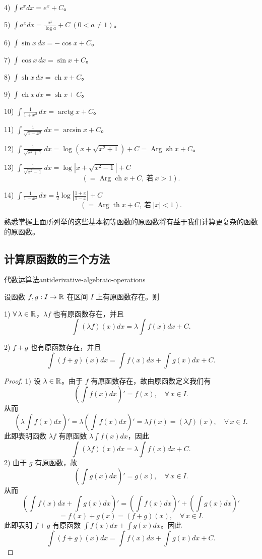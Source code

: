 4) \(\displaystyle\int e^x dx=e^x+C\)。

5) \(\displaystyle\int a^x dx=\frac{a^x}{\log a}+C\ (0<a\neq1)\)。

6) \(\displaystyle\int\sin x\,dx=-\cos x+C\)。

7) \(\displaystyle\int\cos x\,dx=\sin x+C\)。

8) \(\displaystyle\int\operatorname{sh}x\,dx=\operatorname{ch}x+C\)。

9) \(\displaystyle\int\operatorname{ch}x\,dx=\operatorname{sh}x+C\)。

10) \(\displaystyle\int\frac1{1+x^2}\,dx=\operatorname{arctg}x+C\)。

11) \(\displaystyle\int\frac1{\sqrt{1-x^2}}\,dx=\arcsin x+C\)。

12) \(\displaystyle\int\frac1{\sqrt{x^2+1}}\,dx=\log\left(x+\sqrt{x^2+1}\right)+C=\operatorname{Arg}\operatorname{sh}x+C\)。

13) \(\displaystyle\int\frac1{\sqrt{x^2-1}}\,dx=\log\left|x+\sqrt{x^2-1}\right|+C\)
\[
\left(=\operatorname{Arg}\operatorname{ch}x+C,\ \text{若}\ x>1\right).
\]

14) \(\displaystyle\int\frac1{1-x^2}\,dx=\frac12\log\left|\frac{1+x}{1-x}\right|+C\)
\[
\left(=\operatorname{Arg}\operatorname{th}x+C,\ \text{若}\ |x|<1\right).
\]

熟悉掌握上面所列举的这些基本初等函数的原函数将有益于我们计算更复杂的函数的原函数。

\subsection{计算原函数的三个方法}
	\label{sec:7-2-2}

\begin{mythm}{代数运算法}{antiderivative-algebraic-operations}

	设函数 \(f,g:I\to\mathbb{R}\) 在区间 \(I\) 上有原函数存在。则

	1) \(\forall\,\lambda\in\mathbb{R}\)，\(\lambda f\) 也有原函数存在，并且
	\[
	\int(\lambda f)(x)dx=\lambda\int f(x)dx+C.
	\]

	2) \(f+g\) 也有原函数存在，并且
	\[
	\int(f+g)(x)dx=\int f(x)dx+\int g(x)dx+C.
	\]

\end{mythm}

\begin{proof}

	1) 设 \(\lambda\in\mathbb{R}\)。由于 \(f\) 有原函数存在，故由原函数定义我们有
	\[
	\left(\int f(x)dx\right)'=f(x),\quad\forall\,x\in I.
	\]
	从而
	\[
	\left(\lambda\int f(x)dx\right)'=\lambda\left(\int f(x)dx\right)'=\lambda f(x)=(\lambda f)(x),\quad\forall\,x\in I.
	\]
	此即表明函数 \(\lambda f\) 有原函数 \(\lambda\int f(x)dx\)，因此
	\[
	\int(\lambda f)(x)dx=\lambda\int f(x)dx+C.
	\]
	2) 由于 \(g\) 有原函数，故
	\[
	\left(\int g(x)dx\right)'=g(x),\quad\forall\,x\in I.
	\]
	从而
	\[
	\left(\int f(x)dx+\int g(x)dx\right)'=\left(\int f(x)dx\right)'+\left(\int g(x)dx\right)'
	\]
	\[
	=f(x)+g(x)=(f+g)(x),\quad\forall\,x\in I.
	\]
	此即表明 \(f+g\) 有原函数 \(\int f(x)dx+\int g(x)dx\)。因此
	\[
	\int(f+g)(x)dx=\int f(x)dx+\int g(x)dx+C.
	\]

\end{proof}

